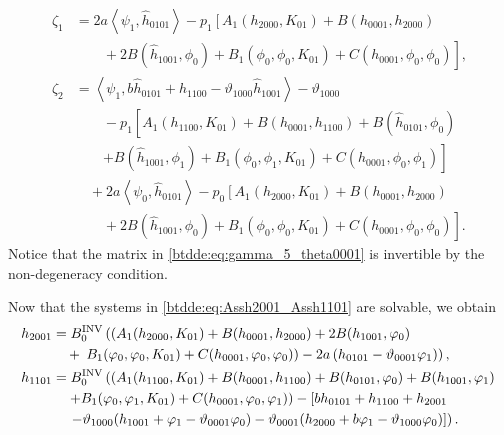 \begin{equation}
\label{btdde:eq:zeta1_zeta2}
\begin{aligned}
    \zeta_1 &=  2a\left< \psi_1, \hat h_{0101} \right> - p_1 \left[   
			  A_1(h_{2000},K_{01}) + B(h_{0001},h_{2000}) \right.  \\
			& \left. \qquad + 2 B(\hat h_{1001},\phi_0)
			+ B_1(\phi_0,\phi_0,K_{01}) + C(h_{0001},\phi_0,\phi_0) \right], \\
    \zeta_2 &= \left< \psi_1, b\hat h_{0101} + h_{1100} - \vartheta_{1000}\hat h_{1001} \right> - \vartheta_{1000}  \\
				& \qquad  - p_1 \left[ A_1(h_{1100},K_{01}) + 
				B(h_{0001},h_{1100}) + B(\hat h_{0101},\phi_0) \right. \\
				& \qquad \left. + B(\hat h_{1001},\phi_1) + B_1(\phi_0,\phi_1,K_{01})
				+ C(h_{0001},\phi_0,\phi_1) \right]  \\
                & \quad + 2a\left< \psi_0, \hat h_{0101} \right> 
                - p_0 \left[ A_1(h_{2000},K_{01}) +
				B(h_{0001},h_{2000}) \right. \\
				& \qquad + \left. 2 B( \hat h_{1001},\phi_0) +
				B_1(\phi_0,\phi_0,K_{01}) + C(h_{0001},\phi_0,\phi_0) \right].
\end{aligned}
\end{equation}	
Notice that the matrix in \cref{btdde:eq:gamma_5_theta0001} is invertible by the
non-degeneracy condition. 

Now that the systems in \cref{btdde:eq:Assh2001_Assh1101} are
solvable, we obtain
\begin{equation}
\label{btdde:eq:h2001_h1101}
\begin{aligned}
h_{2001} &= B^{\mathrm{INV}}_{0} \left( \left(A_1(h_{2000},K_{01}) +B(h_{0001},h_{2000}) + 2 B(h_{1001},\varphi_0) \right.\right. \\
				& \quad + \left.\left. B_1(\varphi_0,\varphi_0,K_{01}) + C(h_{0001},\varphi_0,\varphi_0)\right) - 2 a \left( h_{0101} - \vartheta_{0001} \varphi_1\right)\right), \\
h_{1101} &= B^{\mathrm{INV}}_{0} \left( \left( A_1(h_{1100},K_{01}) + B(h_{0001},h_{1100}) + B(h_{0101},\varphi_0) + B(h_{1001},\varphi_1) \right.\right.  \\
				& \quad  \left. + B_1(\varphi_0,\varphi_1,K_{01}) + C(h_{0001},\varphi_0,\varphi_1) \right) - \left[b h_{0101} + h_{1100} + h_{2001} \right. \\
				& \quad \left.\left. - \vartheta_{1000} (h_{1001} + \varphi_1 - \vartheta_{0001} \varphi_0) 
                               - \vartheta_{0001} (h_{2000} + b \varphi_1 - \vartheta_{1000} \varphi_0)\right]\right).
\end{aligned}
\end{equation}

